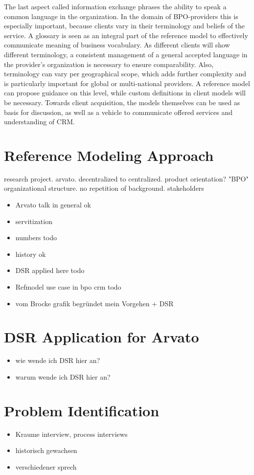 The last aspect called information exchange phrases the ability to speak a common language in the organization. In the domain of BPO-providers this is especially important, because clients vary in their terminology and beliefs of the service. A glossary is seen as an integral part of the reference model to effectively communicate meaning of business vocabulary. As different clients will show different terminology, a consistent management of a general accepted language in the provider’s organization is necessary to ensure comparability. Also, terminology can vary per geographical scope, which adds further complexity and is particularly important for global or multi-national providers. A reference model can propose guidance on this level, while custom definitions in client models will be necessary. Towards client acquisition, the models themselves can be used as basis for discussion, as well as a vehicle to communicate offered services and understanding of CRM.
%
\section{Reference Modeling Approach}
research project. 
arvato. 
decentralized to centralized.
product orientation?
"BPO" 
organizational structure. no repetition of background.
stakeholders

\begin{itemize}
	\item Arvato talk in general ok
	\item servitization
	\item numbers todo
	\item history ok
	\item DSR applied here todo
	\item Refmodel use case in bpo crm todo
	\item vom Brocke grafik begründet mein Vorgehen + DSR
\end{itemize}
\section{DSR Application for Arvato}
\begin{itemize}
	\item wie wende ich DSR hier an?
	\item warum wende ich DSR hier an?
	
\end{itemize}
\section{Problem Identification}
\begin{itemize}
	\item Kraume interview, process interviews
	\item historisch gewachsen
	\item verschiedener sprech
	
\end{itemize}
